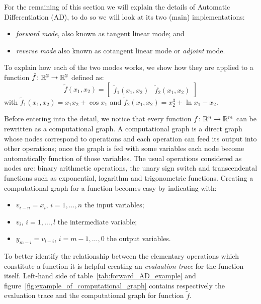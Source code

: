 For the remaining of this section we will explain the details of Automatic Differentiation (AD), to do so we will look at its two (main) implementations:
\begin{itemize}
	\item \emph{forward mode}, also known as tangent linear mode; and
	\item \emph{reverse mode} also known as cotangent linear mode or \emph{adjoint} mode.
\end{itemize}
To explain how each of the two modes works, we show how they are applied to a function $\tilde{f} \colon \mathbb{R}^2 \to \mathbb{R}^2$ defined as:
\begin{equation}
	\label{eqn:example_function_for_AD}
	\tilde{f}(x_1, x_2) = \begin{bmatrix}
					\tilde{f}_1(x_1, x_2)  &  \tilde{f}_2(x_1, x_2)
				  \end{bmatrix}
\end{equation}
with $\tilde{f}_1(x_1, x_2) = x_1 x_2 + \cos x_1$ and $\tilde{f}_2(x_1, x_2) = x_2^3 + \ln x_1 - x_2$.

\smallskip
Before entering into the detail, we notice that every function $f \colon \mathbb{R}^n \to \mathbb{R}^m$ can be rewritten as a computational graph. A computational graph is a direct graph whose nodes correspond to operations and each operation can feed its output into other operations; once the graph is fed with some variables each node become automatically function of those variables. The usual operations considered as nodes are: binary arithmetic operations, the unary sign switch and transcendental functions such as exponential, logarithm and trigonometric functions.
Creating a computational graph for a function becomes easy by indicating with:
\begin{itemize}
	\item $v_{i-n}=x_i$, $i=1, \dots, n$ the input variables;
	\item $v_i$, $i=1, \dots, l$ the intermediate variable;
	\item $y_{m-i}=v_{l-i}$, $i=m-1, \dots, 0$ the output variables.
\end{itemize}
To better identify the relationship between the elementary operations which constitute a function it is helpful creating an \emph{evaluation trace} for the function itself.
Left-hand side of table~\ref{tab:forward_AD_example} and figure~\ref{fig:example_of_computational_graph} contains respectively the evaluation trace and the computational graph for function $\tilde{f}$.

